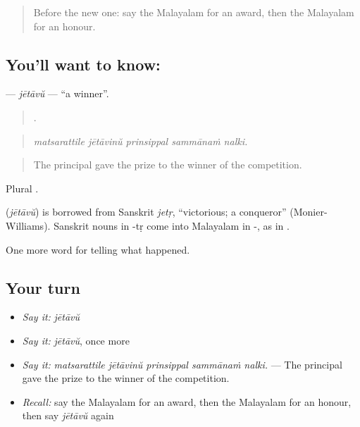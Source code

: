 \label{lesson:ML-C396-jetavu}



\begin{quote}
Before the new one: say the Malayalam for an award, then the Malayalam for an honour.
\end{quote}

\subsection*{You'll want to know: }
\textbf{} — \emph{jētāvŭ} — \textquotedblleft{}a winner\textquotedblright{}.

\begin{quote}
    .
\end{quote}

\begin{quote}
\emph{matsarattile jētāvinŭ prinsippal sammānaṁ nalki.}
\end{quote}

\begin{quote}
The principal gave the prize to the winner of the competition.
\end{quote}

Plural .

\begin{cousinweb}
\textbf{} (\emph{jētāvŭ}) is borrowed from Sanskrit \emph{jetṛ}, \textquotedblleft{}victorious; a conqueror\textquotedblright{} (Monier-Williams). Sanskrit nouns in -tṛ come into Malayalam in -, as in .
\end{cousinweb}

\begin{grammarlens}[title={What you've built}]
One more word for telling what happened.
\end{grammarlens}

\subsection*{Your turn}
\begin{itemize}
\raggedright
  \item \emph{Say it:} \emph{jētāvŭ}
  \item \emph{Say it:} \emph{jētāvŭ}, once more
  \item \emph{Say it:} \emph{matsarattile jētāvinŭ prinsippal sammānaṁ nalki.} — The principal gave the prize to the winner of the competition.
  \item \emph{Recall:} say the Malayalam for an award, then the Malayalam for an honour, then say \emph{jētāvŭ} again
\end{itemize}

